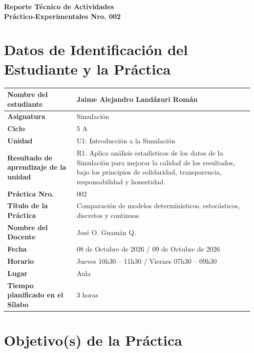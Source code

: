 \documentclass[11pt,a4paper]{article}
\begin{document}
\thispagestyle{fancy}

\vspace*{0.15cm}

\begin{center}
{\bfseries\fontsize{23}{26}\selectfont
Reporte T\'ecnico de Actividades\\
Pr\'actico-Experimentales Nro. 002\par}
\end{center}

\section{Datos de Identificaci\'on del Estudiante y la Pr\'actica}

\noindent
\begin{tabularx}{\textwidth}{|L{0.43\textwidth}|Y|}
\hline
\textbf{Nombre del estudiante} & Jaime Alejandro Land\'azuri Rom\'an \\ \hline
\textbf{Asignatura} & Simulaci\'on \\ \hline
\textbf{Ciclo} & 5 A \\ \hline
\textbf{Unidad} & U1: Introducci\'on a la Simulaci\'on \\ \hline
\textbf{Resultado de aprendizaje de la unidad} & R1. Aplica an\'alisis estad\'isticos de los
datos de la Simulaci\'on para mejorar la calidad de los resultados, bajo los principios de
solidaridad, transparencia, responsabilidad y honestidad. \\ \hline
\textbf{Pr\'actica Nro.} & 002 \\ \hline
\textbf{T\'itulo de la Pr\'actica} & Comparaci\'on de modelos determin\'isticos,
estoc\'asticos, discretos y continuos \\ \hline
\textbf{Nombre del Docente} & Jos\'e O. Guam\'an Q. \\ \hline
\textbf{Fecha} & 08 de Octubre de 2026 / 09 de Octubre de 2026 \\ \hline
\textbf{Horario} & Jueves 10h30 -- 11h30 / Viernes 07h30 -- 09h30 \\ \hline
\textbf{Lugar} & Aula \\ \hline
\textbf{Tiempo planificado en el S\'ilabo} & 3 horas \\ \hline
\end{tabularx}

\section{Objetivo(s) de la Pr\'actica}
\end{document}
